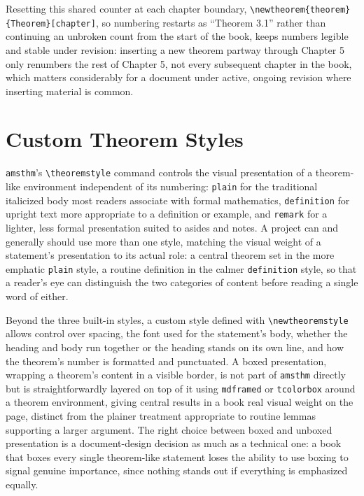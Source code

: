 Resetting this shared counter at each chapter boundary, \texttt{\textbackslash{}newtheorem\{theorem\}\{Theorem\}{[}chapter{]}}, so numbering restarts as ``Theorem 3.1'' rather than continuing an unbroken count from the start of the book, keeps numbers legible and stable under revision: inserting a new theorem partway through Chapter 5 only renumbers the rest of Chapter 5, not every subsequent chapter in the book, which matters considerably for a document under active, ongoing revision where inserting material is common.

\hypertarget{custom-theorem-styles}{%
\section{Custom Theorem Styles}\label{custom-theorem-styles}}

\texttt{amsthm}'s \texttt{\textbackslash{}theoremstyle} command controls the visual presentation of a theorem-like environment independent of its numbering: \texttt{plain} for the traditional italicized body most readers associate with formal mathematics, \texttt{definition} for upright text more appropriate to a definition or example, and \texttt{remark} for a lighter, less formal presentation suited to asides and notes. A project can and generally should use more than one style, matching the visual weight of a statement's presentation to its actual role: a central theorem set in the more emphatic \texttt{plain} style, a routine definition in the calmer \texttt{definition} style, so that a reader's eye can distinguish the two categories of content before reading a single word of either.

Beyond the three built-in styles, a custom style defined with \texttt{\textbackslash{}newtheoremstyle} allows control over spacing, the font used for the statement's body, whether the heading and body run together or the heading stands on its own line, and how the theorem's number is formatted and punctuated. A boxed presentation, wrapping a theorem's content in a visible border, is not part of \texttt{amsthm} directly but is straightforwardly layered on top of it using \texttt{mdframed} or \texttt{tcolorbox} around a theorem environment, giving central results in a book real visual weight on the page, distinct from the plainer treatment appropriate to routine lemmas supporting a larger argument. The right choice between boxed and unboxed presentation is a document-design decision as much as a technical one: a book that boxes every single theorem-like statement loses the ability to use boxing to signal genuine importance, since nothing stands out if everything is emphasized equally.

